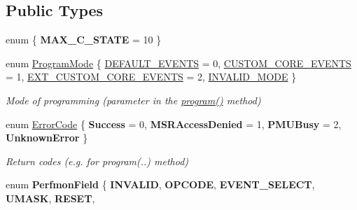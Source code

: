 \subsection*{Public Types}
\begin{DoxyCompactItemize}
\item 
\mbox{\label{class_p_c_m_a0d4ffa4b31603643806e33b899719793}} 
enum \{ {\bfseries M\+A\+X\+\_\+\+C\+\_\+\+S\+T\+A\+TE} = 10
 \}
\item 
enum \mbox{\hyperlink{class_p_c_m_a88584813a3ef51376efeb22928764786}{Program\+Mode}} \{ \mbox{\hyperlink{class_p_c_m_a88584813a3ef51376efeb22928764786a0e861144f482697cfa423b012ed42451}{D\+E\+F\+A\+U\+L\+T\+\_\+\+E\+V\+E\+N\+TS}} = 0, 
\mbox{\hyperlink{class_p_c_m_a88584813a3ef51376efeb22928764786ac092b2b5f351e33046b87e5cee31f38f}{C\+U\+S\+T\+O\+M\+\_\+\+C\+O\+R\+E\+\_\+\+E\+V\+E\+N\+TS}} = 1, 
\mbox{\hyperlink{class_p_c_m_a88584813a3ef51376efeb22928764786a0f2ff80b85b8f9483c7f03544f73fcbd}{E\+X\+T\+\_\+\+C\+U\+S\+T\+O\+M\+\_\+\+C\+O\+R\+E\+\_\+\+E\+V\+E\+N\+TS}} = 2, 
\mbox{\hyperlink{class_p_c_m_a88584813a3ef51376efeb22928764786ad60e2f3b64e27eaaa84d2b07fea8e225}{I\+N\+V\+A\+L\+I\+D\+\_\+\+M\+O\+DE}}
 \}
\begin{DoxyCompactList}\small\item\em Mode of programming (parameter in the \mbox{\hyperlink{class_p_c_m_abae9577a1a172c944d133bef10683825}{program()}} method) \end{DoxyCompactList}\item 
\mbox{\label{class_p_c_m_abebf5f22d794719dfc49155741e264e5}} 
enum \mbox{\hyperlink{class_p_c_m_abebf5f22d794719dfc49155741e264e5}{Error\+Code}} \{ {\bfseries Success} = 0, 
{\bfseries M\+S\+R\+Access\+Denied} = 1, 
{\bfseries P\+M\+U\+Busy} = 2, 
{\bfseries Unknown\+Error}
 \}
\begin{DoxyCompactList}\small\item\em Return codes (e.\+g. for program(..) method) \end{DoxyCompactList}\item 
\mbox{\label{class_p_c_m_a4e729e5eba43d92e18495fc721e981fe}} 
enum {\bfseries Perfmon\+Field} \{ \newline
{\bfseries I\+N\+V\+A\+L\+ID}, 
{\bfseries O\+P\+C\+O\+DE}, 
{\bfseries E\+V\+E\+N\+T\+\_\+\+S\+E\+L\+E\+CT}, 
{\bfseries U\+M\+A\+SK}, 
\newline
{\bfseries R\+E\+S\+ET}, 

\end{DoxyCompactItemize}

